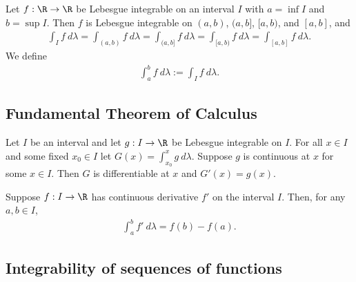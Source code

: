 \documentclass{article}
\begin{document}
\begin{corollary}
	Let $f:\R\to\R$ be Lebesgue integrable on an interval $I$ with $a=\inf I$ and $b=\sup I$.
	Then $f$ is Lebesgue integrable on $(a,b)$, $(a,b]$, $[a,b)$, and $[a,b]$, and
	\begin{align*}
		\int_I f\:d\lambda 
		= \int_{(a,b)} f\:d\lambda
		= \int_{(a,b]} f\:d\lambda 
		= \int_{[a,b)} f\:d\lambda 
		= \int_{[a,b]} f\:d\lambda. 
	\end{align*}
	We define
	\begin{align*}
		\int_a^b f\:d\lambda := \int_If\:d\lambda.	
	\end{align*}
\end{corollary}

\subsection{Fundamental Theorem of Calculus}

\begin{theorem}
	Let $I$ be an interval and let $g:I\to\R$ be Lebesgue integrable on $I$. For all $x\in I$ and
	some fixed $x_0\in I$ let $G(x) = \int_{x_0}^x g\:d\lambda$. Suppose $g$ is continuous at $x$
	for some $x\in I$. Then $G$ is differentiable at $x$ and $G'(x)=g(x)$.
\end{theorem}

\begin{theorem}
	Suppose $f:I\to\R$ has continuous derivative $f'$ on the interval $I$. Then, for any
	$a,b\in I$,
	\begin{align*}
		\int_a^b f'\:d\lambda= f(b) - f(a).
	\end{align*}
\end{theorem}

\subsection{Integrability of sequences of functions}
\end{document}

